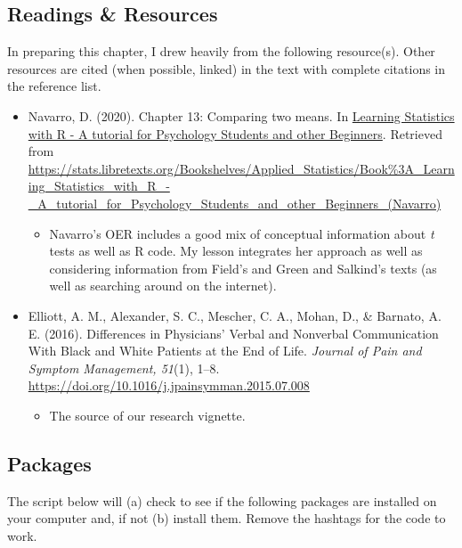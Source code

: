 \documentclass[
  11pt,
]{book}
\providecommand{\tightlist}{%
  \setlength{\itemsep}{0pt}\setlength{\parskip}{0pt}}
\begin{document}
\hypertarget{readings-resources-1}{%
\subsection{Readings \& Resources}\label{readings-resources-1}}

In preparing this chapter, I drew heavily from the following resource(s). Other resources are cited (when possible, linked) in the text with complete citations in the reference list.

\begin{itemize}
\tightlist
\item
  Navarro, D. (2020). Chapter 13: Comparing two means. In \href{https://learningstatisticswithr.com/}{Learning Statistics with R - A tutorial for Psychology Students and other Beginners}. Retrieved from \url{https://stats.libretexts.org/Bookshelves/Applied_Statistics/Book\%3A_Learning_Statistics_with_R_-_A_tutorial_for_Psychology_Students_and_other_Beginners_(Navarro)}

  \begin{itemize}
  \tightlist
  \item
    Navarro's OER includes a good mix of conceptual information about \emph{t} tests as well as R code. My lesson integrates her approach as well as considering information from Field's \citeyearpar{field_discovering_2012} and Green and Salkind's \citeyearpar{green_using_2014} texts (as well as searching around on the internet).
  \end{itemize}
\item
  Elliott, A. M., Alexander, S. C., Mescher, C. A., Mohan, D., \& Barnato, A. E. (2016). Differences in Physicians' Verbal and Nonverbal Communication With Black and White Patients at the End of Life. \emph{Journal of Pain and Symptom Management, 51}(1), 1--8. \url{https://doi.org/10.1016/j.jpainsymman.2015.07.008}

  \begin{itemize}
  \tightlist
  \item
    The source of our research vignette.
  \end{itemize}
\end{itemize}

\hypertarget{packages}{%
\subsection{Packages}\label{packages}}

The script below will (a) check to see if the following packages are installed on your computer and, if not (b) install them. Remove the hashtags for the code to work.
\end{document}
